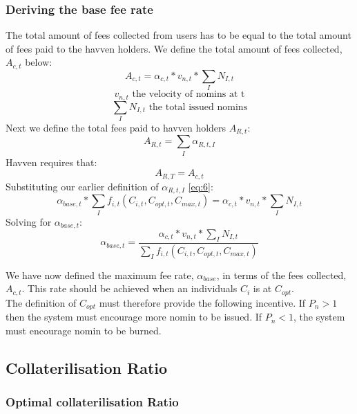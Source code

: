 \subsubsection{Deriving the base fee rate}The total amount of fees collected from users has to be equal to the total amount of fees paid to the havven holders. We define the total amount of fees collected, $A_{c,t}$ below: \\
\begin{equation}
A_{c,t}  = \alpha_{c,t} * v_{n,t} * \sum\limits_I N_{I,t}  \label{eq:8}
\end{equation}
$$ v_{n,t} \text{ the velocity of nomins at t} $$
$$  \sum\limits_I N_{I,t} \text{ the total issued nomins} $$
Next we define the total fees paid to havven holders $A_{R,t}$: \\
\begin{equation}
A_{R,t} = \sum\limits_I \alpha_{R,t,I} \label{eq:9}
\end{equation}
Havven requires that: \\
$$ A_{R,T} =  A_{c,t} $$
Substituting our earlier definition of $\alpha_{R,t,I}$ \eqref{eq:6}: \\
$$ \alpha_{base,t} *\sum\limits_I f_{i,t}(C_{i,t}, C_{opt,t}, C_{max,t}) =  \alpha_{c,t} * v_{n,t} * \sum\limits_I N_{I,t} $$
Solving for $\alpha_{base,t} $:\\
\begin{equation}
\alpha_{base,t} = \frac{\alpha_{c,t} * v_{n,t} * \sum\limits_I N_{I,t}}{\sum\limits_I f_{i,t}(C_{i,t}, C_{opt,t},C_{max,t})} \label{eq:10}
\end{equation}

\noindent We have now defined the maximum fee rate, $\alpha_{base}$, in terms of the fees collected, $A_{c,t}$. This rate should be achieved when an individuals $C_i$ is at $C_{opt}$. \\

\noindent The definition of $C_{opt}$ must therefore provide the following incentive. If $P_n > 1$ then the system must encourage more nomin to be issued. If $P_n < 1$, the system must encourage nomin to be burned. 

\newpage

\subsection{Collaterilisation Ratio}
\subsubsection{Optimal collaterilisation Ratio}

